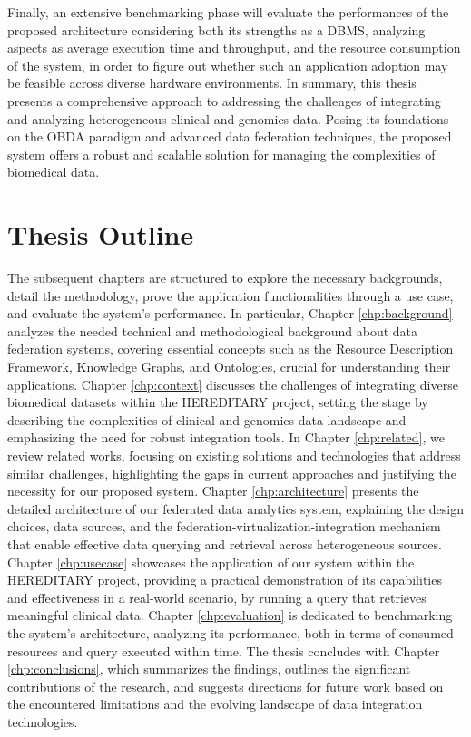 Finally, an extensive benchmarking phase will evaluate the performances of the proposed architecture considering both its strengths as a \ac{DBMS}, analyzing aspects as average execution time and throughput, and the resource consumption of the system, in order to figure out whether such an application adoption may be feasible across diverse hardware environments.
In summary, this thesis presents a comprehensive approach to addressing the challenges of integrating and analyzing heterogeneous clinical and genomics data. Posing its foundations on the \ac{OBDA} paradigm and advanced data federation techniques, the proposed system offers a robust and scalable solution for managing the complexities of biomedical data.
\section{Thesis Outline}
The subsequent chapters are structured to explore the necessary backgrounds, detail the methodology, prove the application functionalities through a use case, and evaluate the system's performance.
In particular, Chapter \ref{chp:background} analyzes the needed technical and methodological background about data federation systems, covering essential concepts such as the Resource Description Framework, Knowledge Graphs, and Ontologies, crucial for understanding their applications. Chapter \ref{chp:context} discusses the challenges of integrating diverse biomedical datasets within the \ac{HEREDITARY} project, setting the stage by describing the complexities of clinical and genomics data landscape and emphasizing the need for robust integration tools.
In Chapter \ref{chp:related}, we review related works, focusing on existing solutions and technologies that address similar challenges, highlighting the gaps in current approaches and justifying the necessity for our proposed system. Chapter \ref{chp:architecture} presents the detailed architecture of our federated data analytics system, explaining the design choices, data sources, and the federation-virtualization-integration mechanism that enable effective data querying and retrieval across heterogeneous sources.
Chapter \ref{chp:usecase} showcases the application of our system within the \ac{HEREDITARY} project, providing a practical demonstration of its capabilities and effectiveness in a real-world scenario, by running a query that retrieves meaningful clinical data. Chapter \ref{chp:evaluation} is dedicated to benchmarking the system's architecture, analyzing its performance, both in terms of consumed resources and query executed within time.
The thesis concludes with Chapter \ref{chp:conclusions}, which summarizes the findings, outlines the significant contributions of the research, and suggests directions for future work based on the encountered limitations and the evolving landscape of data integration technologies.